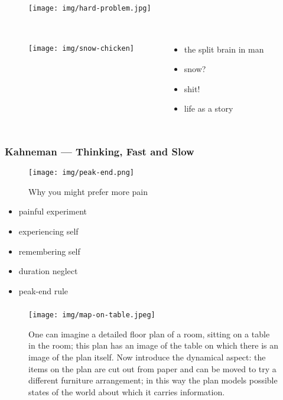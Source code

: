 \documentclass[UTF8,11pt,colorlinks,compress,openany]{beamer}%
\begin{document}
\begin{frame}\frametitle{}
\begin{figure}[H]
\texttt{[image: img/hard-problem.jpg]}
\end{figure}
\end{frame}

\begin{frame}\frametitle{}
\begin{columns}
	\begin{figure}[H]
		\begin{center}
			\texttt{[image: img/snow-chicken]}
		\end{center}
	\end{figure}
\begin{itemize}
	\item the split brain in man
	\item snow?
	\item shit!
	\item life as a story
\end{itemize}
\end{columns}
\end{frame}

\begin{frame}\frametitle{Kahneman --- Thinking, Fast and Slow}
	\begin{figure}[H]
		\begin{center}
			\texttt{[image: img/peak-end.png]}\caption{Why you might prefer more pain}
		\end{center}
	\end{figure}
\begin{itemize}
	\item painful experiment
	\item experiencing self
	\item remembering self
	\item duration neglect
	\item peak-end rule
\end{itemize}
\end{frame}

\begin{frame}\frametitle{}
\begin{figure}
\texttt{[image: img/map-on-table.jpeg]}\caption{One can imagine a detailed floor plan of a room, sitting on a table in the room; this plan has an image of the table on which there is an image of the plan itself. Now introduce the dynamical aspect: the items on the plan are cut out from paper and can be moved to try a different furniture arrangement; in this way the plan models possible states of the world about which it carries information.}
\end{figure}
\end{frame}
\end{document}
